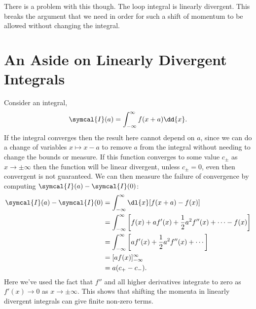 \documentclass[fleqn]{NotesClass}
\begin{document}
    There is a problem with this though.
    The loop integral is linearly divergent.
    This breaks the argument that we need in order for such a shift of momentum to be allowed without changing the integral.
    
    \section{An Aside on Linearly Divergent Integrals}
    Consider an integral,
    \begin{equation}
        \symcal{I}(a) = \int_{-\infty}^{\infty} f(x + a)\dd{x}.
    \end{equation}
    If the integral converges then the result here cannot depend on \(a\), since we can do a change of variables \(x \mapsto x - a\) to remove \(a\) from the integral without needing to change the bounds or measure.
    If this function converges to some value \(c_{\pm}\) as \(x \to \pm \infty\) then the function will be linear divergent, unless \(c_{\pm} = 0\), even then convergent is not guaranteed.
    We can then measure the failure of convergence by computing \(\symcal{I}(a) - \symcal{I}(0)\):
    \begin{align}
        \symcal{I}(a) - \symcal{I}(0) &= \int_{-\infty}^{\infty} \dl{x} [f(x + a) - f(x)]\\
        &= \int_{-\infty}^{\infty} \left[ f(x) + af'(x) + \frac{1}{2}a^2f''(x) + \dotsb - f(x) \right]\\
        &= \int_{-\infty}^{\infty} \left[ af'(x) + \frac{1}{2}a^2f''(x) + \dotsb \right]\\
        &= [af(x)]_{-\infty}^{\infty}\\
        &= a(c_+ - c_-).
    \end{align}
    Here we've used the fact that \(f''\) and all higher derivatives integrate to zero as \(f'(x) \to 0\) as \(x \to \pm \infty\).
    This shows that shifting the momenta in linearly divergent integrals can give finite non-zero terms.
    
\end{document}

